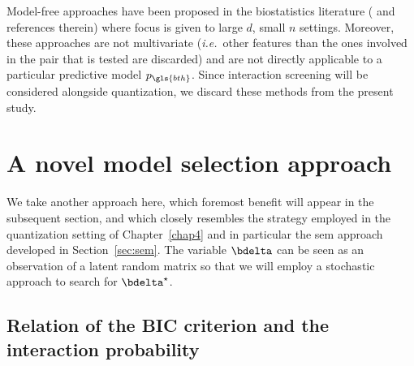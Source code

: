Model-free approaches have been proposed in the biostatistics literature (\cite{yang2008snpharvester,zhang2010team,li2013model,dong2008exploration,zhang2007bayesian,wan2010boost} and references therein) where focus is given to large $d$, small $n$ settings. Moreover, these approaches are not multivariate (\textit{i.e.}\ other features than the ones involved in the pair that is tested are discarded) and are not directly applicable to a particular predictive model $p_{\gls{bth}}$. Since interaction screening will be considered alongside quantization, we discard these methods from the present study.

\section{A novel model selection approach}

We take another approach here, which foremost benefit will appear in the subsequent section, and which closely resembles the strategy employed in the quantization setting of Chapter~\ref{chap4} and in particular the \gls{sem} approach developed in Section~\ref{sec:sem}. The variable $\bdelta$ can be seen as an observation of a latent random matrix so that we will employ a stochastic approach to search for $\bdelta^\star$.

\subsection{Relation of the BIC criterion and the interaction probability}

